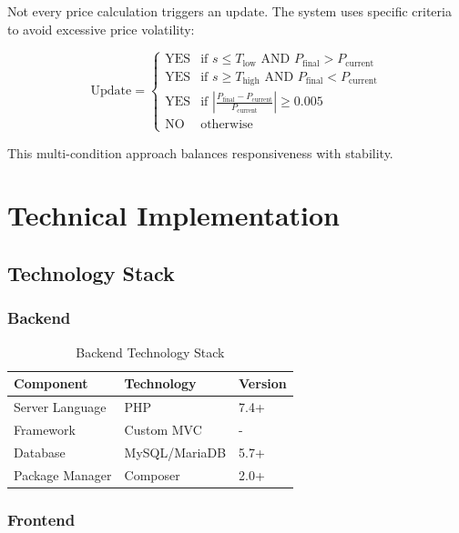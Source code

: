 \documentclass[12pt,a4paper,oneside]{report}
\begin{document}
Not every price calculation triggers an update. The system uses specific criteria to avoid excessive price volatility:

\begin{equation}
\text{Update} = \begin{cases}
\text{YES} & \text{if } s \leq T_{\text{low}} \text{ AND } P_{\text{final}} > P_{\text{current}} \\
\text{YES} & \text{if } s \geq T_{\text{high}} \text{ AND } P_{\text{final}} < P_{\text{current}} \\
\text{YES} & \text{if } \left|\frac{P_{\text{final}} - P_{\text{current}}}{P_{\text{current}}}\right| \geq 0.005 \\
\text{NO} & \text{otherwise}
\end{cases}
\end{equation}

This multi-condition approach balances responsiveness with stability.

\newpage

\chapter{Technical Implementation}

\section{Technology Stack}

\subsection{Backend}

\begin{table}[H]
    \centering
    \begin{tabular}{lll}
        \toprule
        \textbf{Component} & \textbf{Technology} & \textbf{Version} \\
        \midrule
        Server Language & PHP & 7.4+ \\
        Framework & Custom MVC & - \\
        Database & MySQL/MariaDB & 5.7+ \\
        Package Manager & Composer & 2.0+ \\
        \bottomrule
    \end{tabular}
    \caption{Backend Technology Stack}
    \label{tab:backend_stack}
\end{table}

\subsection{Frontend}
\end{document}
